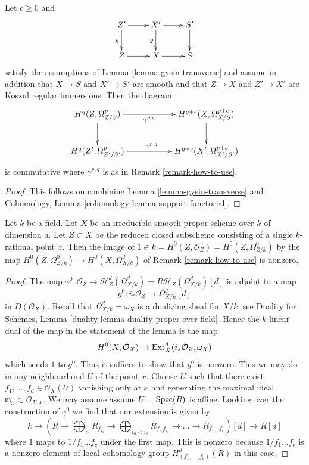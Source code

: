 \begin{lemma}
\label{lemma-gysin-transverse-global}
Let $c \geq 0$ and
$$
\xymatrix{
Z' \ar[d]_h \ar[r] & X' \ar[d]_g \ar[r] & S' \ar[d] \\
Z \ar[r] & X \ar[r] & S
}
$$
satisfy the assumptions of Lemma \ref{lemma-gysin-transverse} and assume
in addition that $X \to S$ and $X' \to S'$ are smooth and that
$Z \to X$ and $Z' \to X'$ are Koszul regular immersions.
Then the diagram
$$
\xymatrix{
H^q(Z, \Omega^p_{Z/S}) \ar[rr]_-{\gamma^{p, q}} \ar[d] & &
H^{q + c}(X, \Omega^{p + c}_{X/S}) \ar[d] \\
H^q(Z', \Omega^p_{Z'/S'}) \ar[rr]^{\gamma^{p, q}} & &
H^{q + c}(X', \Omega^{p + c}_{X'/S'})
}
$$
is commutative where $\gamma^{p, q}$ is as in Remark \ref{remark-how-to-use}.
\end{lemma}

\begin{proof}
This follows on combining Lemma \ref{lemma-gysin-transverse}
and Cohomology, Lemma \ref{cohomology-lemma-support-functorial}.
\end{proof}

\begin{lemma}
\label{lemma-class-of-a-point}
Let $k$ be a field. Let $X$ be an irreducible smooth proper scheme over $k$
of dimension $d$. Let $Z \subset X$ be the reduced closed subscheme consisting
of a single $k$-rational point $x$. Then the image of
$1 \in k = H^0(Z, \mathcal{O}_Z) = H^0(Z, \Omega^0_{Z/k})$
by the map $H^0(Z, \Omega^0_{Z/k}) \to H^d(X, \Omega^d_{X/k})$
of Remark \ref{remark-how-to-use} is nonzero.
\end{lemma}

\begin{proof}
The map $\gamma^0 : \mathcal{O}_Z \to
\mathcal{H}^d_Z(\Omega^d_{X/k}) = R\mathcal{H}_Z(\Omega^d_{X/k})[d]$
is adjoint to a map
$$
g^0 : i_*\mathcal{O}_Z \longrightarrow \Omega^d_{X/k}[d]
$$
in $D(\mathcal{O}_X)$. Recall that $\Omega^d_{X/k} = \omega_X$ is a
dualizing sheaf for $X/k$, see
Duality for Schemes, Lemma \ref{duality-lemma-duality-proper-over-field}.
Hence the $k$-linear dual of the map in the statement
of the lemma is the map
$$
H^0(X, \mathcal{O}_X) \to \mathop{\mathrm{Ext}}\nolimits^d_X(i_*\mathcal{O}_Z, \omega_X)
$$
which sends $1$ to $g^0$. Thus it suffices to show that $g^0$ is nonzero.
This we may do in any neighbourhood $U$ of the point $x$. Choose $U$
such that there exist $f_1, \ldots, f_d \in \mathcal{O}_X(U)$
vanishing only at $x$ and generating the maximal ideal
$\mathfrak m_x \subset \mathcal{O}_{X, x}$. We may assume
assume $U = \mathop{\mathrm{Spec}}(R)$ is affine. Looking over the
construction of $\gamma^0$ we find that our extension is given by
$$
k \to
(R \to \bigoplus\nolimits_{i_0} R_{f_{i_0}} \to
\bigoplus\nolimits_{i_0 < i_1} R_{f_{i_0}f_{i_1}} \to
\ldots \to R_{f_1\ldots f_r})[d] \to R[d]
$$
where $1$ maps to $1/f_1 \ldots f_c$ under the first map.
This is nonzero because $1/f_1 \ldots f_c$ is a nonzero element
of local cohomology group $H^d_{(f_1, \ldots, f_d)}(R)$ in this case,
\end{proof}



